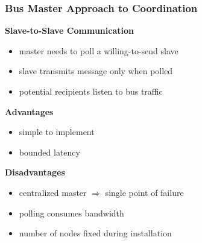 \documentclass{beamer}
\newcommand{\paragraph}[1]{\vspace{6pt}\textbf{#1}}
\begin{document}
\begin{frame}
  \frametitle{Bus Master Approach to Coordination}
  
  \paragraph{Slave-to-Slave Communication}
  \begin{itemize}
    \item master needs to poll a willing-to-send slave
    \item slave transmits message only when polled
    \item potential recipients listen to bus traffic
  \end{itemize}

  \paragraph{Advantages}
  \begin{itemize}
    \item simple to implement
    \item bounded latency
  \end{itemize}
  
  \paragraph{Disadvantages}
  \begin{itemize}
    \item centralized master $\Rightarrow$ single point of failure
    \item polling consumes bandwidth
    \item number of nodes fixed during installation
  \end{itemize}
\end{frame}
\end{document}
